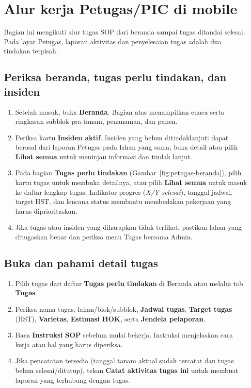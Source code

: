 \section{Alur kerja Petugas/PIC di mobile}

Bagian ini mengikuti alur tugas SOP dari beranda sampai tugas ditandai selesai. Pada layar Petugas, laporan aktivitas dan penyelesaian tugas adalah dua tindakan terpisah.

\subsection{Periksa beranda, tugas perlu tindakan, dan insiden}

\begin{enumerate}
  \item Setelah masuk, buka \textbf{Beranda}. Bagian atas menampilkan cuaca serta ringkasan subblok pra-tanam, penanaman, dan panen.
  \item Periksa kartu \textbf{Insiden aktif}. Insiden yang belum ditindaklanjuti dapat berasal dari laporan Petugas pada lahan yang sama; buka detail atau pilih \textbf{Lihat semua} untuk meninjau informasi dan tindak lanjut.
  \item Pada bagian \textbf{Tugas perlu tindakan} (Gambar~\ref{fig:petugas-beranda}), pilih kartu tugas untuk membuka detailnya, atau pilih \textbf{Lihat semua} untuk masuk ke daftar lengkap tugas. Indikator progres (\emph{X/Y selesai}), tanggal jadwal, target HST, dan lencana status membantu membedakan pekerjaan yang harus diprioritaskan.
  \item Jika tugas atau insiden yang diharapkan tidak terlihat, pastikan lahan yang ditugaskan benar dan periksa menu Tugas bersama Admin.
\end{enumerate}


\subsection{Buka dan pahami detail tugas}

\begin{enumerate}
  \item Pilih tugas dari daftar \textbf{Tugas perlu tindakan} di Beranda atau melalui tab \textbf{Tugas}.
  \item Periksa nama tugas, lahan/blok/subblok, \textbf{Jadwal tugas}, \textbf{Target tugas} (HST), \textbf{Varietas}, \textbf{Estimasi HOK}, serta \textbf{Jendela pelaporan}.
  \item Baca \textbf{Instruksi SOP} sebelum mulai bekerja. Instruksi menjelaskan cara kerja atau hal yang harus diperiksa.
  \item Jika pencatatan tersedia (tanggal tanam aktual sudah tercatat dan tugas belum selesai/ditutup), tekan \textbf{Catat aktivitas tugas ini} untuk membuat laporan yang terhubung dengan tugas.
\end{enumerate}

